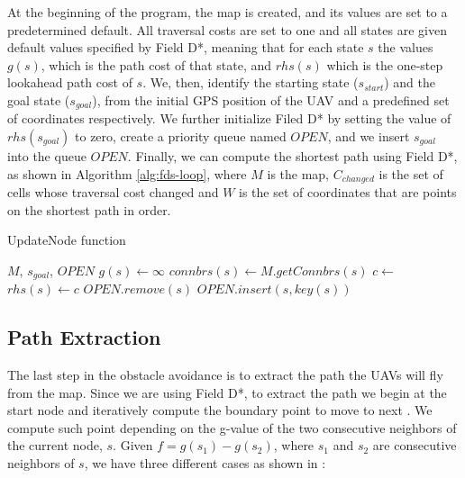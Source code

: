 At the beginning of the program, the map is created, and its values are set to a predetermined
default. All traversal costs are set to one and all states are given default values specified 
by Field D*, meaning that for each state $s$ the values $g(s)$, which is the path cost of 
that state, and $rhs(s)$ which is the one-step lookahead path cost of $s$. We, then,
identify the starting state ($s_{start}$) and the goal state ($s_{goal}$), from the 
initial GPS position of the UAV and a predefined set of coordinates respectively. We further
initialize Filed D* by setting the value of $rhs(s_{goal})$ to zero, create a priority queue
named $OPEN$, and we insert $s_{goal}$ into the queue $OPEN$. Finally, we can compute the 
shortest path using Field D*, as shown in Algorithm \ref{alg:fds-loop}, where $M$ is
the map, $C_{changed}$ is the set of cells whose traversal cost changed and $W$ is the 
set of coordinates that are points on the shortest path in order.

\begin{algorithm}
	\algrenewcommand{}
	\algrenewcommand{}
	\caption{UpdateNode function}\label{alg:upnode}
	\begin{algorithmic}[1]
		\Require $M$, $s_{goal}$, $OPEN$
			\State $g(s) \gets \infty$
			\EndIf
			\State $connbrs(s) \gets M.getConnbrs(s)$
				\State $c \gets$ 
				\State $rhs(s) \gets c$ 
				\EndIf
			\EndFor
			\EndIf
			\State $OPEN.remove(s)$ 
			\EndIf
			\State $OPEN.insert(s, key(s))$ 
			\EndIf
		\EndFunction
	\end{algorithmic}
\end{algorithm}

\subsection{Path Extraction}

The last step in the obstacle avoidance is to extract the path the UAVs will fly from the map. 
Since we are using Field D*, to extract the path we begin at the start node and iteratively 
compute the boundary point to move to next \autocite{DF06}. We compute such point depending on
the g-value of the two consecutive neighbors of the current node, $s$. Given $f = g(s_1) - g(s_2)$,
where $s_1$ and $s_2$ are consecutive neighbors of $s$, we have three different cases as
shown in \autocite{DF06}:


